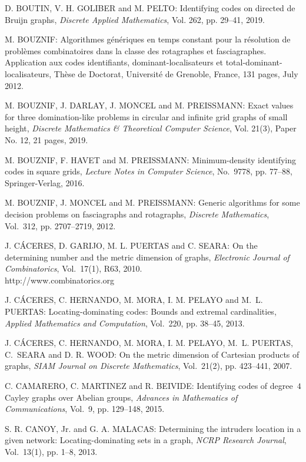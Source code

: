 \begin{thebibliography}{999}
D. BOUTIN, V. H. GOLIBER and M. PELTO: Identifying codes on directed de Bruijn graphs, {\it Discrete Applied Mathematics}, Vol. 262, pp. 29--41, 2019.

M. BOUZNIF: Algorithmes g\'en\'eriques en temps constant pour la r\'eso\-lution de probl\`emes combinatoires dans la classe des rotagraphes et fasciagraphes. Application aux codes identifiants, dominant-localisateurs et total-dominant-localisateurs, Th\`ese de Doctorat, Universit\'e de Grenoble, France, 131 pages, July 2012.

M. BOUZNIF, J. DARLAY, J. MONCEL and M. PREISSMANN: Exact values for three domination-like problems in circular and infinite grid graphs of small height, {\it Discrete Mathematics \& Theoretical Computer Science}, Vol. 21(3), Paper No. 12, 21 pages, 2019.

M. BOUZNIF, F. HAVET and M. PREISSMANN: Minimum-density identifying codes in square grids, {\it Lecture Notes in Computer Science}, No.~9778, pp. 77--88, Springer-Verlag, 2016.

M. BOUZNIF, J. MONCEL and M. PREISSMANN: Generic algorithms for some decision problems on fasciagraphs and rotagraphs, {\it Discrete Mathematics}, Vol.~312, pp. 2707--2719, 2012.

J. C\'ACERES, D. GARIJO, M. L. PUERTAS and C. SEARA: On the determining number and the metric dimension of graphs, {\it Electronic Journal of Combinatorics}, Vol.~17(1), R63, 2010.\\
http://www.combinatorics.org

J. C\'ACERES, C. HERNANDO, M. MORA, I. M. PELAYO and M.~L. PUERTAS: Locating-dominating codes: Bounds and extremal cardinalities, {\it Applied Mathematics and Computation}, Vol.~220, pp. 38--45, 2013.

J. C\'ACERES, C. HERNANDO, M. MORA, I. M. PELAYO, M.~L. PUERTAS, C.~SEARA and D. R. WOOD: On the metric dimension of Cartesian products of graphs, {\it SIAM Journal on Discrete Mathematics}, Vol.~21(2), pp. 423--441, 2007. 

C. CAMARERO, C. MARTINEZ and R. BEIVIDE: Identifying codes of degree~$4$ Cayley graphs over Abelian groups, {\it Advances in Mathematics of Communications}, Vol.~9, pp. 129--148, 2015.

S. R. CANOY, Jr. and G. A. MALACAS: Determining the intruders location in a given network: Locating-dominating sets in a graph, {\it NCRP Research Journal}, Vol.~13(1), pp. 1--8, 2013.


\end{thebibliography}

